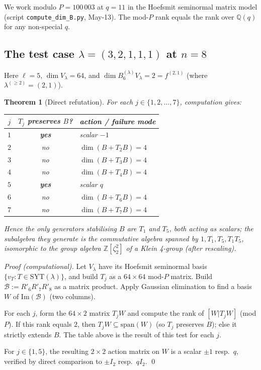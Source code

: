 \documentclass[11pt]{article}
\newtheorem{theorem}{Theorem}
\theoremstyle{definition}
\begin{document}
We work modulo $P = 100\,003$ at $q = 11$ in the Hoefsmit seminormal
matrix model (script \texttt{compute\_dim\_B.py}, May-13). The mod-$P$
rank equals the rank over $\mathbb{Q}(q)$ for any non-special $q$.

\subsection{The test case $\lambda = (3, 2, 1, 1, 1)$ at $n = 8$}

Here $\ell = 5$, $\dim V_\lambda = 64$, and
$\dim B_{6}^{(\lambda)} V_\lambda = 2 = f^{(2,1)}$ (where
$\lambda^{(\ge 2)} = (2, 1)$).

\begin{theorem}[Direct refutation]\label{thm:refutation}
For each $j \in \{1, 2, \ldots, 7\}$, computation gives:
\begin{center}
\renewcommand{\arraystretch}{1.15}
\begin{tabular}{c|c|l}
\toprule
$j$ & $T_j$ preserves $B$? & action / failure mode \\
\midrule
$1$ & \textbf{yes}  & scalar $-1$ \\
$2$ & no            & $\dim(B + T_2 B) = 4$ \\
$3$ & no            & $\dim(B + T_3 B) = 4$ \\
$4$ & no            & $\dim(B + T_4 B) = 4$ \\
$5$ & \textbf{yes}  & scalar $q$ \\
$6$ & no            & $\dim(B + T_6 B) = 4$ \\
$7$ & no            & $\dim(B + T_7 B) = 4$ \\
\bottomrule
\end{tabular}
\end{center}
Hence the only generators stabilising $B$ are $T_1$ and $T_5$, both
acting as scalars; the subalgebra they generate is the commutative
algebra spanned by $1, T_1, T_5, T_1 T_5$, isomorphic to the group
algebra $\mathbb{Z}[\zeta_2^2]$ of a Klein 4-group (after rescaling).
\end{theorem}

\begin{proof}[Proof (computational)]
Let $V_\lambda$ have its Hoefsmit seminormal basis $\{v_T : T \in
\mathrm{SYT}(\lambda)\}$, and build $T_j$ as a $64 \times 64$
mod-$P$ matrix. Build $\mathcal{B} := R'_6 R'_7 R'_8$ as a matrix
product. Apply Gaussian elimination to find a basis $W$ of
$\mathrm{Im}(\mathcal{B})$ (two columns).

For each $j$, form the $64 \times 2$ matrix $T_j W$ and compute the
rank of $[W | T_j W]$ (mod $P$). If this rank equals $2$, then
$T_j W \subseteq \mathrm{span}(W)$ (so $T_j$ preserves $B$); else it
strictly extends $B$. The table above is the result of this test for
each $j$.

For $j \in \{1, 5\}$, the resulting $2 \times 2$ action matrix on $W$
is a scalar $\pm 1$ resp.\ $q$, verified by direct comparison to $\pm I_2$
resp.\ $q I_2$. \qed
\end{proof}
\end{document}
